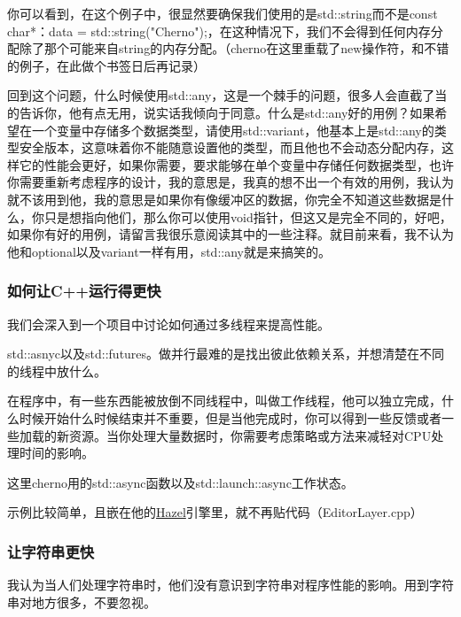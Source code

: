 你可以看到，在这个例子中，很显然要确保我们使用的是{\ncodestyle std::string}而不是{\ncodestyle const char*}：{\ncodestyle data = std::string("Cherno");}，在这种情况下，我们不会得到任何内存分配除了那个可能来自{\ncodestyle string}的内存分配。（cherno在这里重载了{\ncodestyle new}操作符，和不错的例子，在此做个书签日后再记录）

回到这个问题，什么时候使用{\ncodestyle std::any}，这是一个棘手的问题，很多人会直截了当的告诉你，他有点无用，说实话我倾向于同意。什么是{\ncodestyle std::any}好的用例？如果希望在一个变量中存储多个数据类型，请使用{\ncodestyle std::variant}，他基本上是{\ncodestyle std::any}的类型安全版本，这意味着你不能随意设置他的类型，而且他也不会动态分配内存，这样它的性能会更好，如果你需要，要求能够在单个变量中存储任何数据类型，也许你需要重新考虑程序的设计，我的意思是，我真的想不出一个有效的用例，我认为就不该用到他，我的意思是如果你有像缓冲区的数据，你完全不知道这些数据是什么，你只是想指向他们，那么你可以使用{\ncodestyle void}指针，但这又是完全不同的，好吧，如果你有好的用例，请留言我很乐意阅读其中的一些注释。就目前来看，我不认为他和{\ncodestyle optional}以及{\ncodestyle variant}一样有用，{\ncodestyle std::any}就是来搞笑的。


\subsubsection{如何让C++运行得更快}

我们会深入到一个项目中讨论如何通过多线程来提高性能。

{\ncodestyle std::asnyc}以及{\ncodestyle std::futures}。做并行最难的是找出彼此依赖关系，并想清楚在不同的线程中放什么。

在程序中，有一些东西能被放倒不同线程中，叫做工作线程，他可以独立完成，什么时候开始什么时候结束并不重要，但是当他完成时，你可以得到一些反馈或者一些加载的新资源。当你处理大量数据时，你需要考虑策略或方法来减轻对CPU处理时间的影响。

这里cherno用的{\ncodestyle std::async}函数以及{\ncodestyle std::launch::async}工作状态。


示例比较简单，且嵌在他的\href{https://github.com/TheCherno/Hazel}{Hazel}引擎里，就不再贴代码（EditorLayer.cpp）

\subsubsection{让字符串更快}

我认为当人们处理字符串时，他们没有意识到字符串对程序性能的影响。用到字符串对地方很多，不要忽视。

